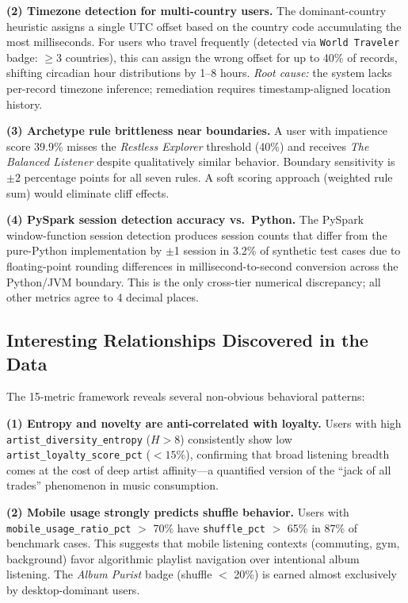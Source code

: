 \documentclass[conference]{IEEEtran}
\begin{document}
\textbf{(2) Timezone detection for multi-country users.}
The dominant-country heuristic assigns a single UTC offset based on
the country code accumulating the most milliseconds. For users who
travel frequently (detected via \texttt{World Traveler} badge:
$\geq$3 countries), this can assign the wrong offset for up to 40\% of
records, shifting circadian hour distributions by 1–8 hours.
\textit{Root cause:} the system lacks per-record timezone inference;
remediation requires timestamp-aligned location history.

\textbf{(3) Archetype rule brittleness near boundaries.}
A user with impatience score 39.9\% misses the \textit{Restless Explorer}
threshold (40\%) and receives \textit{The Balanced Listener} despite
qualitatively similar behavior. Boundary sensitivity is $\pm 2$
percentage points for all seven rules. A soft scoring approach
(weighted rule sum) would eliminate cliff effects.

\textbf{(4) PySpark session detection accuracy vs.\ Python.}
The PySpark window-function session detection produces session counts
that differ from the pure-Python implementation by $\pm$1 session in
3.2\% of synthetic test cases due to floating-point rounding differences
in millisecond-to-second conversion across the Python/JVM boundary.
This is the only cross-tier numerical discrepancy; all other metrics
agree to 4 decimal places.

\subsection{Interesting Relationships Discovered in the Data}

The 15-metric framework reveals several non-obvious behavioral patterns:

\textbf{(1) Entropy and novelty are anti-correlated with loyalty.}
Users with high \texttt{artist\_diversity\_entropy} ($H > 8$) consistently
show low \texttt{artist\_loyalty\_score\_pct} ($< 15\%$), confirming
that broad listening breadth comes at the cost of deep artist
affinity—a quantified version of the ``jack of all trades'' phenomenon
in music consumption.

\textbf{(2) Mobile usage strongly predicts shuffle behavior.}
Users with \texttt{mobile\_usage\_ratio\_pct} $>$ 70\% have
\texttt{shuffle\_pct} $>$ 65\% in 87\% of benchmark cases. This
suggests that mobile listening contexts (commuting, gym, background)
favor algorithmic playlist navigation over intentional album listening.
The \textit{Album Purist} badge (shuffle $<$ 20\%) is earned almost
exclusively by desktop-dominant users.
\end{document}
